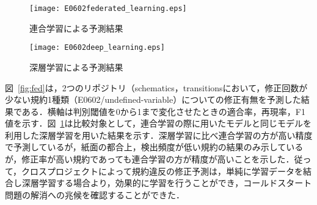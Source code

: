 \documentclass[uplatex,dvipdfmx,a4paper,twocolumn,base=11pt,jbase=11pt,ja=standard]{bxjsarticle}  %
\begin{document}
\begin{figure}
\begin{center}
\texttt{[image: E0602federated\_learning.eps]}
\vspace{-3mm}
\caption{連合学習による予測結果}
\label{fig:fed}
\end{center}

\vspace{-8mm}

\begin{center}
\texttt{[image: E0602deep\_learning.eps]}
\vspace{-3mm}
\caption{深層学習による予測結果}
\label{fig:deep}
\end{center}
\vspace{-12mm}
\end{figure}






図~\ref{fig:fed}は，2つのリポジトリ（schematics，transitionsにおいて，修正回数が少ない規約1種類（E0602/undefined-variable）についての修正有無を予測した結果である．横軸は判別閾値を0から1まで変化させたときの適合率，再現率，F1値を示す．図~\ref{fig:deep}は比較対象として，連合学習の際に用いたモデルと同じモデルを利用した深層学習を用いた結果を示す．深層学習に比べ連合学習の方が高い精度で予測しているが，紙面の都合上，検出頻度が低い規約の結果のみ示しているが，修正率が高い規約であっても連合学習の方が精度が高いことを示した．従って，クロスプロジェクトによって規約違反の修正予測は，単純に学習データを結合し深層学習する場合より，効果的に学習を行うことができ，コールドスタート問題の解消への兆候を確認することができた．
\end{document}
